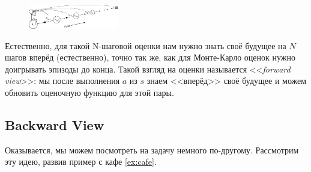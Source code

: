 \begin{figure}
\centering
\includegraphics[width=0.35\textwidth]{Images/forward_view.png}
\vspace{-0.5cm}
\end{figure}
Естественно, для такой N-шаговой оценки нам нужно знать своё будущее на $N$ шагов вперёд (естественно), точно так же, как для Монте-Карло оценок нужно доигрывать эпизоды до конца. Такой взгляд на оценки называется <<\emph{forward view}>>: мы после выполнения $a$ из $s$ знаем <<вперёд>> своё будущее и можем обновить оценочную функцию для этой пары.

\subsection{Backward View}
Оказывается, мы можем посмотреть на задачу немного по-другому. Рассмотрим эту идею, развив пример с кафе \ref{ex:cafe}.

